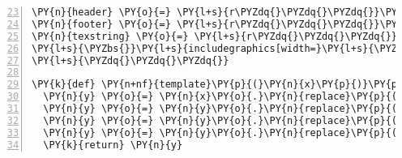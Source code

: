 \begin{Verbatim}[commandchars=\\\{\},numbers=left,numbersep=0.5em,firstnumber=23]
\PY{n}{header} \PY{o}{=} \PY{l+s}{r\PYZdq{}\PYZdq{}\PYZdq{}}\PY{l+s}{\PYZbs{}}\PY{l+s}{begin\PYZob{}multicols\PYZcb{}\PYZob{}[=[cols]=]\PYZcb{}}\PY{l+s}{\PYZdq{}\PYZdq{}\PYZdq{}}
\PY{n}{footer} \PY{o}{=} \PY{l+s}{r\PYZdq{}\PYZdq{}\PYZdq{}}\PY{l+s}{\PYZbs{}}\PY{l+s}{end\PYZob{}multicols\PYZcb{}}\PY{l+s}{\PYZdq{}\PYZdq{}\PYZdq{}}
\PY{n}{texstring} \PY{o}{=} \PY{l+s}{r\PYZdq{}\PYZdq{}\PYZdq{}}
\PY{l+s}{\PYZbs{}}\PY{l+s}{includegraphics[width=}\PY{l+s}{\PYZbs{}}\PY{l+s}{linewidth]\PYZob{}[=[name]=]\PYZcb{}}
\PY{l+s}{\PYZdq{}\PYZdq{}\PYZdq{}}

\PY{k}{def} \PY{n+nf}{template}\PY{p}{(}\PY{n}{x}\PY{p}{)}\PY{p}{:}
  \PY{n}{y} \PY{o}{=} \PY{n}{x}\PY{o}{.}\PY{n}{replace}\PY{p}{(}\PY{l+s}{\PYZdq{}}\PY{l+s}{\PYZob{}}\PY{l+s}{\PYZdq{}}\PY{p}{,}\PY{l+s}{\PYZdq{}}\PY{l+s}{\PYZob{}\PYZob{}}\PY{l+s}{\PYZdq{}}\PY{p}{)}
  \PY{n}{y} \PY{o}{=} \PY{n}{y}\PY{o}{.}\PY{n}{replace}\PY{p}{(}\PY{l+s}{\PYZdq{}}\PY{l+s}{\PYZcb{}}\PY{l+s}{\PYZdq{}}\PY{p}{,}\PY{l+s}{\PYZdq{}}\PY{l+s}{\PYZcb{}\PYZcb{}}\PY{l+s}{\PYZdq{}}\PY{p}{)}
  \PY{n}{y} \PY{o}{=} \PY{n}{y}\PY{o}{.}\PY{n}{replace}\PY{p}{(}\PY{l+s}{\PYZdq{}}\PY{l+s}{[=[}\PY{l+s}{\PYZdq{}}\PY{p}{,}\PY{l+s}{\PYZdq{}}\PY{l+s}{\PYZob{}}\PY{l+s}{\PYZdq{}}\PY{p}{)}
  \PY{n}{y} \PY{o}{=} \PY{n}{y}\PY{o}{.}\PY{n}{replace}\PY{p}{(}\PY{l+s}{\PYZdq{}}\PY{l+s}{]=]}\PY{l+s}{\PYZdq{}}\PY{p}{,}\PY{l+s}{\PYZdq{}}\PY{l+s}{\PYZcb{}}\PY{l+s}{\PYZdq{}}\PY{p}{)}
  \PY{k}{return} \PY{n}{y}
\end{Verbatim}
